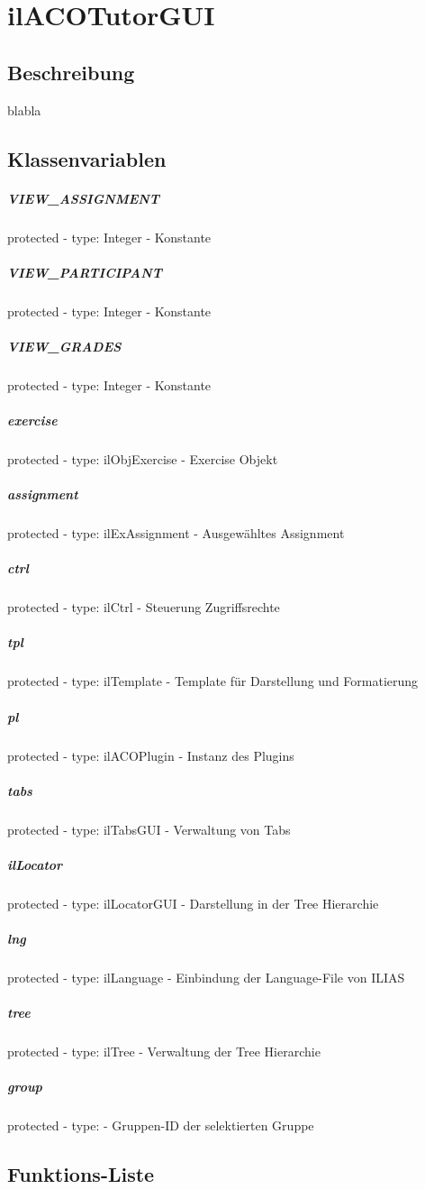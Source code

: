 \section{ilACOTutorGUI}

\subsection*{Beschreibung}
blabla

\subsection*{Klassenvariablen}
\subparagraph{VIEW\_ASSIGNMENT}
protected - type: Integer - Konstante
\subparagraph{VIEW\_PARTICIPANT}
protected - type: Integer - Konstante
\subparagraph{VIEW\_GRADES}
protected - type: Integer - Konstante
\subparagraph{exercise}
protected - type: ilObjExercise - Exercise Objekt
\subparagraph{assignment}
protected - type: ilExAssignment - Ausgewähltes Assignment
\subparagraph{ctrl}
protected - type: ilCtrl - Steuerung Zugriffsrechte
\subparagraph{tpl}
protected - type: ilTemplate - Template für Darstellung und Formatierung
\subparagraph{pl}
protected - type: ilACOPlugin - Instanz des Plugins
\subparagraph{tabs}
protected - type: ilTabsGUI - Verwaltung von Tabs
\subparagraph{ilLocator}
protected - type: ilLocatorGUI - Darstellung in der Tree Hierarchie
\subparagraph{lng}
protected - type: ilLanguage - Einbindung der Language-File von ILIAS
\subparagraph{tree}
protected - type: ilTree - Verwaltung der Tree Hierarchie
\subparagraph{group}
protected - type:  - Gruppen-ID der selektierten Gruppe



\subsection*{Funktions-Liste}
\paragraph{}
\paragraph{}
\paragraph{}
\paragraph{}
